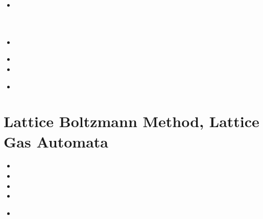 \begin{scriptsize}
\begin{itemize}
\item[\twothousandtwenty] 
 \\
 \\
 \\
\item[\twothousandtwentyone] 
 \\
\item[\twothousandtwentytwo] 
\item[\twothousandtwentythree] 
\item[\twothousandtwentyfour] 
 \\
\end{itemize}
\end{scriptsize}








\section{Lattice Boltzmann Method, Lattice Gas Automata}

\begin{scriptsize}
\begin{itemize}
\item[\nineteeneightyseven]
\item[\twothousandeight]
\item[\twothousandseventeen]
\item[\twothousandeighteen]
\item[\twothousandtwentythree]
 \\
\end{itemize}
\end{scriptsize}


